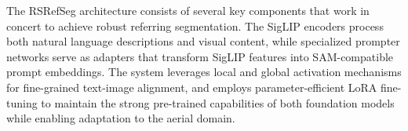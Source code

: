 The RSRefSeg architecture consists of several key components that work in concert to achieve robust referring segmentation. The SigLIP encoders process both natural language descriptions and visual content, while specialized prompter networks serve as adapters that transform SigLIP features into SAM-compatible prompt embeddings. The system leverages local and global activation mechanisms for fine-grained text-image alignment, and employs parameter-efficient LoRA fine-tuning to maintain the strong pre-trained capabilities of both foundation models while enabling adaptation to the aerial domain.

